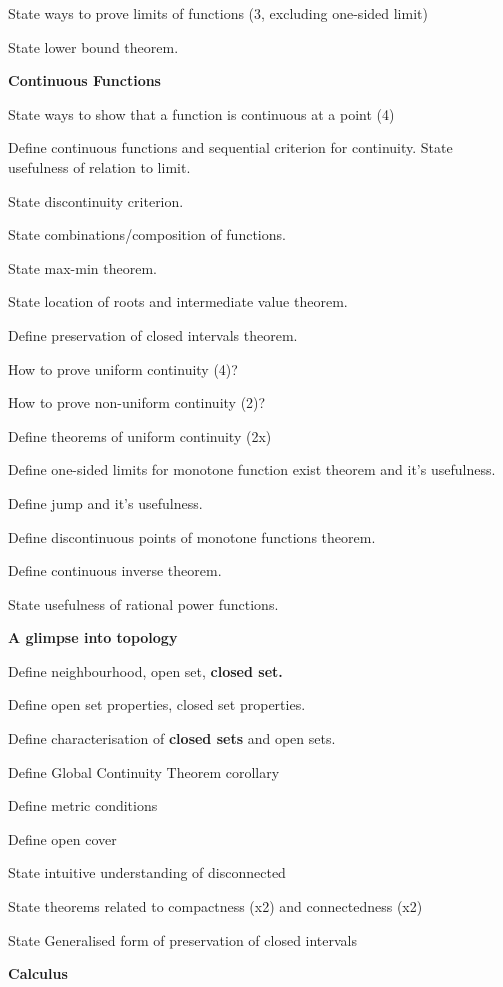 \documentclass[10pt,landscape]{article}
\begin{document}
\begin{multicols}{4}
State ways to prove limits of functions (3, excluding one-sided limit)

State lower bound theorem.

\textbf{Continuous Functions}

State ways to show that a function is continuous at a point (4)

Define continuous functions and sequential criterion for continuity. State usefulness of relation to limit.

State discontinuity criterion.

State combinations/composition of functions.


State max-min theorem.

State location of roots and intermediate value theorem.

Define preservation of closed intervals theorem.

How to prove uniform continuity (4)?

How to prove non-uniform continuity (2)?

Define theorems of uniform continuity (2x)

Define one-sided limits for monotone function exist theorem and it's usefulness.

Define jump and it's usefulness.

Define discontinuous points of monotone functions theorem.

Define continuous inverse theorem.

State usefulness of rational power functions.

\textbf{A glimpse into topology}

Define neighbourhood, open set, \textbf{closed set.}

Define open set properties, closed set properties.

Define characterisation of \textbf{closed sets} and open sets.

Define Global Continuity Theorem corollary

Define metric conditions

Define open cover

State intuitive understanding of disconnected

State theorems related to compactness (x2) and connectedness (x2)

State Generalised form of preservation of closed intervals

\textbf{Calculus}


\end{multicols}
\end{document}
